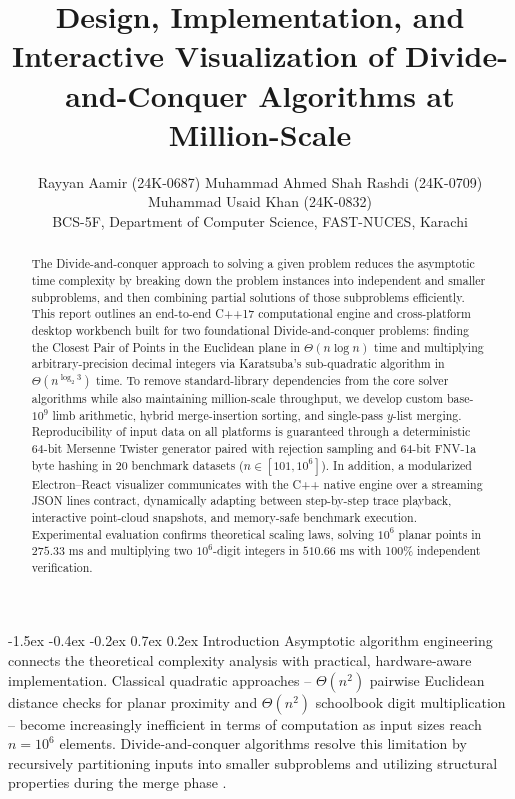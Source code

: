 \documentclass[10pt,twocolumn]{article}
\title{\vspace{-2.2em}\Large\textbf{Design, Implementation, and Interactive Visualization of Divide-and-Conquer Algorithms at Million-Scale}\vspace{-0.4em}}
\author{\small Rayyan Aamir (24K-0687) \quad Muhammad Ahmed Shah Rashdi (24K-0709) \quad Muhammad Usaid Khan (24K-0832)\\
\small BCS-5F, Department of Computer Science, FAST-NUCES, Karachi}
\date{\vspace{-1.8em}}
\makeatletter
\renewcommand\section{\@startsection{section}{1}{\z@}%
  {-1.5ex \@plus -0.4ex \@minus -0.2ex}%
  {0.7ex \@plus 0.2ex}%
  {\normalfont\normalsize\bfseries}}
\makeatother
\begin{document}
\maketitle

\begin{abstract}
The Divide-and-conquer approach to solving a given problem reduces the asymptotic time complexity by breaking down the problem instances into independent and smaller subproblems, and then combining partial solutions of those subproblems efficiently. This report outlines an end-to-end C++17 computational engine and cross-platform desktop workbench built for two foundational Divide-and-conquer problems: finding the Closest Pair of Points in the Euclidean plane in $\Theta(n \log n)$ time and multiplying arbitrary-precision decimal integers via Karatsuba's sub-quadratic algorithm in $\Theta(n^{\log_2 3})$ time. To remove standard-library dependencies from the core solver algorithms while also maintaining million-scale throughput, we develop custom base-$10^9$ limb arithmetic, hybrid merge-insertion sorting, and single-pass $y$-list merging. Reproducibility of input data on all platforms is guaranteed through a deterministic 64-bit Mersenne Twister generator paired with rejection sampling and 64-bit FNV-1a byte hashing in 20 benchmark datasets ($n \in [101, 10^6]$). In addition, a modularized Electron--React visualizer communicates with the C++ native engine over a streaming JSON lines contract, dynamically adapting between step-by-step trace playback, interactive point-cloud snapshots, and memory-safe benchmark execution. Experimental evaluation confirms theoretical scaling laws, solving $10^6$ planar points in $275.33\text{ ms}$ and multiplying two $10^6$-digit integers in $510.66\text{ ms}$ with 100\% independent verification.\newline
\end{abstract}

\section{Introduction}
Asymptotic algorithm engineering connects the theoretical complexity analysis with practical, hardware-aware implementation. Classical quadratic approaches -- $\Theta(n^2)$ pairwise Euclidean distance checks for planar proximity and $\Theta(n^2)$ schoolbook digit multiplication -- become increasingly inefficient in terms of computation as input sizes reach $n = 10^6$ elements. Divide-and-conquer algorithms resolve this limitation by recursively partitioning inputs into smaller subproblems and utilizing structural properties during the merge phase \cite{cormen2022introduction}.
\end{document}
